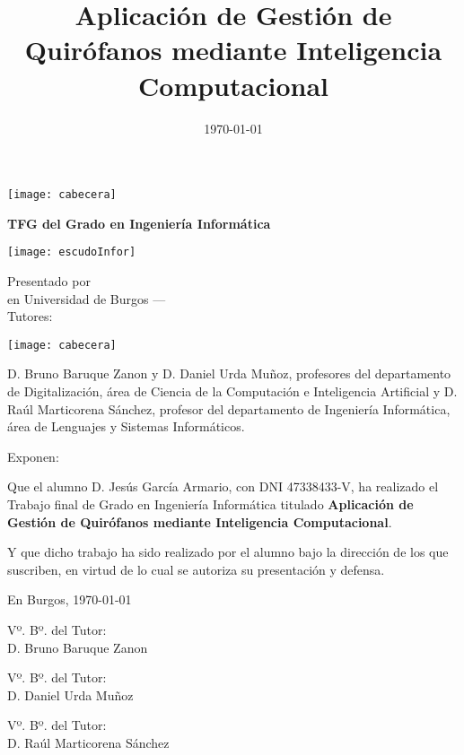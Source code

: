 \documentclass[a4paper,12pt,twoside]{memoir}
\title{Aplicación de Gestión de Quirófanos mediante Inteligencia Computacional}
\author{\nombre}
\date{\today}
\makeatletter
\def\maketitle{
  \null
  \thispagestyle{empty}
\noindent\texttt{[image: cabecera]}\vspace{1cm}%
  \vfill
  \colorbox{cpardoBox}{%
    \begin{minipage}{.8\textwidth}
      \vspace{.5cm}\Large
      \begin{center}
      \textbf{TFG del Grado en Ingeniería Informática}\vspace{.6cm}\\
      \textbf{\LARGE\@title{}}
      \end{center}
      \vspace{.2cm}
    \end{minipage}

  }%
  \hfill\begin{minipage}{.20\textwidth}
    \texttt{[image: escudoInfor]}
  \end{minipage}
  \vfill
  \begin{center}%
  {%
    \noindent\LARGE
    Presentado por \@author{}\\ 
    en Universidad de Burgos --- \@date{}\\
    Tutores: \@tutor{}\\
  }%
  \end{center}%
  \null
  \cleardoublepage
  }
\newcommand{\nombre}{Jesús García Armario} %
\makeatother
\begin{document}
\maketitle


\newpage\null\thispagestyle{empty}\newpage


\thispagestyle{empty}


\noindent\texttt{[image: cabecera]}\vspace{1cm}

\noindent D. Bruno Baruque Zanon y D. Daniel Urda Muñoz, profesores del departamento de Digitalización, área de Ciencia de la Computación e Inteligencia Artificial y D. Raúl Marticorena Sánchez, profesor del departamento de Ingeniería Informática, área de Lenguajes y Sistemas Informáticos.

\noindent Exponen:

\noindent Que el alumno D. \nombre, con DNI 47338433-V, ha realizado el Trabajo final de Grado en Ingeniería Informática titulado \textbf{Aplicación de Gestión de Quirófanos mediante Inteligencia Computacional}. 

\noindent Y que dicho trabajo ha sido realizado por el alumno bajo la dirección de los que suscriben, en virtud de lo cual se autoriza su presentación y defensa.

\begin{center} %
En Burgos, {\large \today}
\end{center}

\vfill\vfill\vfill

\begin{minipage}{0.35\textwidth}
\begin{flushleft} %
Vº. Bº. del Tutor:\\[2cm]
D. Bruno Baruque Zanon
\end{flushleft}
\end{minipage}
\hfill
\begin{minipage}{0.35\textwidth}
\begin{flushleft} %
Vº. Bº. del Tutor:\\[2cm]
D. Daniel Urda Muñoz
\end{flushleft}
\end{minipage}
\hfill


\begin{minipage}{0.35\textwidth}
\begin{flushleft}%
Vº. Bº. del Tutor:\\[2cm]
D. Raúl Marticorena Sánchez
\end{flushleft}
\end{minipage}
\hfill
\end{document}
